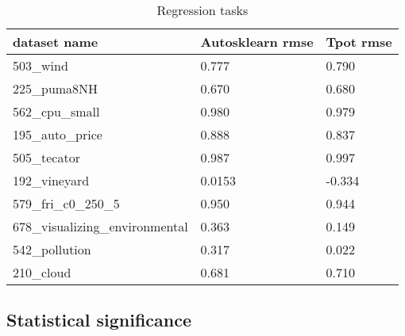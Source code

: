 \begin{table}[]
\centering
\begin{tabular}{|l|l|l|}
\hline
dataset name                    & \multicolumn{1}{c|}{Autosklearn rmse} & Tpot rmse \\ \hline
503\_wind                       & 0.777                                 & 0.790     \\ \hline
225\_puma8NH                    & 0.670                                 & 0.680     \\ \hline
562\_cpu\_small                 & 0.980                                 & 0.979     \\ \hline
195\_auto\_price                & 0.888                                 & 0.837     \\ \hline
505\_tecator                    & 0.987                                 & 0.997     \\ \hline
192\_vineyard                   & 0.0153                                & -0.334    \\ \hline
579\_fri\_c0\_250\_5            & 0.950                                 & 0.944     \\ \hline
678\_visualizing\_environmental & 0.363                                 & 0.149     \\ \hline
542\_pollution                  & 0.317                                 & 0.022     \\ \hline
210\_cloud                      & 0.681                                 & 0.710     \\ \hline
\end{tabular}
\caption{Regression tasks}
\label{tbl:regression_tasks}
\end{table}


\subsection{Statistical significance}

